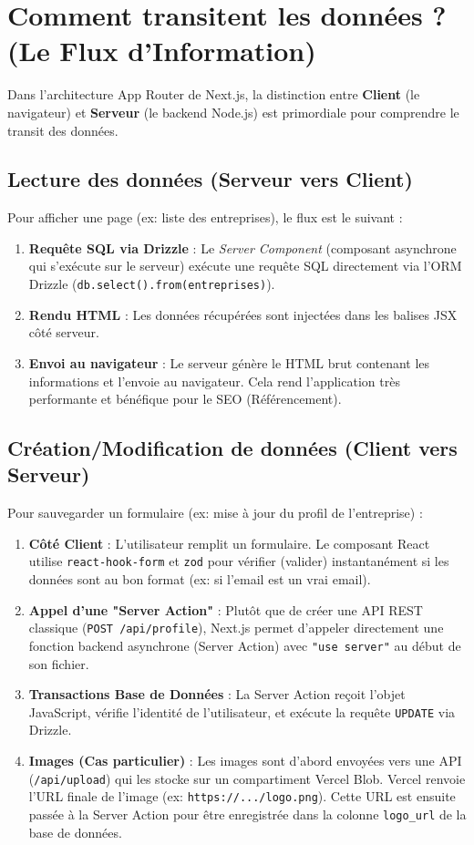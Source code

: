 \documentclass[12pt,a4paper]{article}
\begin{document}
\section{Comment transitent les données ? (Le Flux d'Information)}
Dans l'architecture App Router de Next.js, la distinction entre \textbf{Client} (le navigateur) et \textbf{Serveur} (le backend Node.js) est primordiale pour comprendre le transit des données.

\subsection{Lecture des données (Serveur vers Client)}
Pour afficher une page (ex: liste des entreprises), le flux est le suivant :
\begin{enumerate}
    \item \textbf{Requête SQL via Drizzle} : Le \textit{Server Component} (composant asynchrone qui s'exécute sur le serveur) exécute une requête SQL directement via l'ORM Drizzle (\texttt{db.select().from(entreprises)}).
    \item \textbf{Rendu HTML} : Les données récupérées sont injectées dans les balises JSX côté serveur.
    \item \textbf{Envoi au navigateur} : Le serveur génère le HTML brut contenant les informations et l'envoie au navigateur. Cela rend l'application très performante et bénéfique pour le SEO (Référencement).
\end{enumerate}

\subsection{Création/Modification de données (Client vers Serveur)}
Pour sauvegarder un formulaire (ex: mise à jour du profil de l'entreprise) :
\begin{enumerate}
    \item \textbf{Côté Client} : L'utilisateur remplit un formulaire. Le composant React utilise \texttt{react-hook-form} et \texttt{zod} pour vérifier (valider) instantanément si les données sont au bon format (ex: si l'email est un vrai email).
    \item \textbf{Appel d'une "Server Action"} : Plutôt que de créer une API REST classique (\texttt{POST /api/profile}), Next.js permet d'appeler directement une fonction backend asynchrone (Server Action) avec \texttt{"use server"} au début de son fichier.
    \item \textbf{Transactions Base de Données} : La Server Action reçoit l'objet JavaScript, vérifie l'identité de l'utilisateur, et exécute la requête \texttt{UPDATE} via Drizzle.
    \item \textbf{Images (Cas particulier)} : Les images sont d'abord envoyées vers une API (\texttt{/api/upload}) qui les stocke sur un compartiment Vercel Blob. Vercel renvoie l'URL finale de l'image (ex: \texttt{https://.../logo.png}). Cette URL est ensuite passée à la Server Action pour être enregistrée dans la colonne \texttt{logo\_url} de la base de données.
\end{enumerate}
\end{document}
